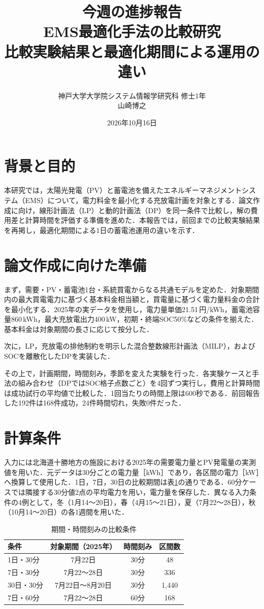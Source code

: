 \documentclass[a4paper,11pt,xelatex,ja=standard]{bxjsarticle}
\title{今週の進捗報告\\[0.5em]\large EMS最適化手法の比較研究\\比較実験結果と最適化期間による運用の違い}
\author{神戸大学大学院システム情報学研究科 修士1年\\山崎博之}
\date{2026年10月16日}
\begin{document}
\maketitle

\section{背景と目的}
本研究では，太陽光発電（PV）と蓄電池を備えたエネルギーマネジメントシステム（EMS）について，電力料金を最小化する充放電計画を対象とする．論文作成に向け，線形計画法（LP）と動的計画法（DP）を同一条件で比較し，解の費用差と計算時間を評価する準備を進めた．本報告では，前回までの比較実験結果を再掲し，最適化期間による1日の蓄電池運用の違いを示す．

\section{論文作成に向けた準備}
まず，需要・PV・蓄電池1台・系統買電からなる共通モデルを定めた．対象期間内の最大買電電力に基づく基本料金相当額と，買電量に基づく電力量料金の合計を最小化する．2025年の実データを使用し，電力量単価21.51\,円/kWh，蓄電池容量860\,kWh，最大充放電出力400\,kW，初期・終端SOC50\%などの条件を揃えた．基本料金は対象期間の長さに応じて按分した．

次に，LP，充放電の排他制約を明示した混合整数線形計画法（MILP），およびSOCを離散化したDPを実装した．

その上で，計画期間，時間刻み，季節を変えた実験を行った．各実験ケースと手法の組み合わせ（DPではSOC格子点数ごと）を4回ずつ実行し，費用と計算時間は成功試行の平均値で比較した．1回当たりの時間上限は600秒である．前回報告した192件は168件成功，24件時間切れ，失敗0件だった．

\section{計算条件}
入力には北海道十勝地方の施設における2025年の需要電力量とPV発電量の実測値を用いた．元データは30分ごとの電力量［kWh］であり，各区間の電力［kW］へ換算して使用した．1日，7日，30日の比較期間は表\ref{tab:conditions}の通りである．60分ケースでは隣接する30分値2点の平均電力を用い，電力量を保存した．異なる入力条件の4例として，冬（1月14～20日），春（4月15～21日），夏（7月22～28日），秋（10月14～20日）の各1週間を用いた．

\begin{table}[htbp]
    \centering
    \caption{期間・時間刻みの比較条件}
    \label{tab:conditions}
    \begin{tabular}{lccc}
        \toprule
        条件      & 対象期間（2025年） & 時間刻み & 区間数   \\
        \midrule
        1日・30分  & 7月22日       & 30分  & 48    \\
        7日・30分  & 7月22～28日    & 30分  & 336   \\
        30日・30分 & 7月22日～8月20日 & 30分  & 1,440 \\
        7日・60分  & 7月22～28日    & 60分  & 168   \\
        \bottomrule
    \end{tabular}
\end{table}
\end{document}
